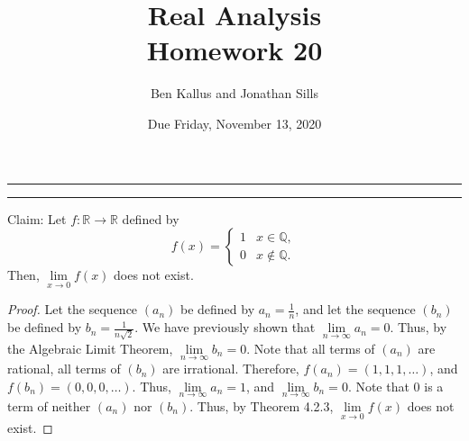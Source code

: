 \documentclass[12pt]{article}
\title{Real Analysis \\ Homework 20}
\author{Ben Kallus and Jonathan Sills}
\date{Due Friday, November 13, 2020}
\begin{document}
\pagecolor{black}
\color{white}
\maketitle

\hrule
\bigskip


\bigskip
\hrule
\bigskip

 Claim: Let $f: \mathbb R \to \mathbb R$ defined by \[f(x) = \begin{cases} 1 & x \in \mathbb Q, \\ 0 & x \notin \mathbb Q. \end{cases}\] Then, $\lim\limits_{x \to 0}f(x)$ does not exist.
\begin{proof}
    Let the sequence $(a_n)$ be defined by $a_n = \frac1n$, and let the sequence $(b_n)$ be defined by $b_n = \frac1{n\sqrt2}$.
    We have previously shown that $\lim\limits_{n\to\infty} a_n = 0$.
    Thus, by the Algebraic Limit Theorem, $\lim\limits_{n\to\infty} b_n = 0$.
    Note that all terms of $(a_n)$ are rational, all terms of $(b_n)$ are irrational.
    Therefore, $f(a_n) = (1, 1, 1, \hdots)$, and $f(b_n) = (0, 0, 0, \hdots)$.
    Thus, $\lim\limits_{n\to\infty} a_n = 1$, and $\lim\limits_{n\to\infty} b_n = 0$.
    Note that 0 is a term of neither $(a_n)$ nor $(b_n)$.
    Thus, by Theorem 4.2.3, $\lim\limits_{x\to0}f(x)$ does not exist.
\end{proof}
\end{document}
